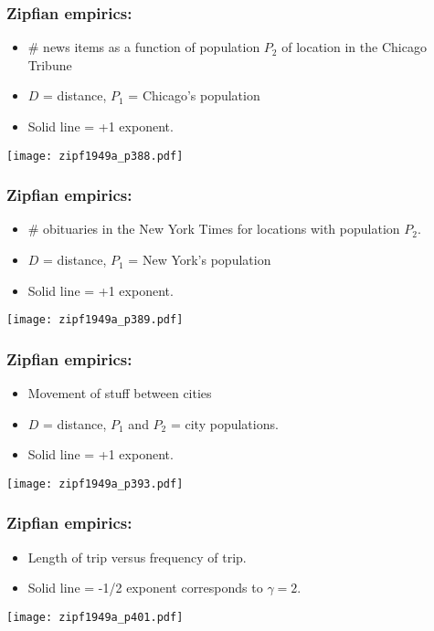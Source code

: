 \begin{frame}
  \frametitle{Zipfian empirics:}

  \begin{itemize}
  \item 
    \# news items as a function of population $P_2$ of location
    in the Chicago Tribune 
  \item
    $D$ = distance, $P_1$ = Chicago's population
  \item
    Solid line = +1 exponent.
  \end{itemize}
  \begin{center}
    \texttt{[image: zipf1949a\_p388.pdf]}
  \end{center}

\end{frame}

\begin{frame}
  \frametitle{Zipfian empirics:}

  \begin{itemize}
  \item 
    \# obituaries in the New York Times for locations
    with population $P_2$.
  \item
    $D$ = distance, $P_1$ = New York's population
  \item
    Solid line = +1 exponent.
  \end{itemize}
  \begin{center}
    \texttt{[image: zipf1949a\_p389.pdf]}
  \end{center}

\end{frame}


\begin{frame}
  \frametitle{Zipfian empirics:}

  \begin{itemize}
  \item 
    Movement of stuff between cities
  \item
    $D$ = distance, $P_1$ and $P_2$ = city populations.
  \item
    Solid line = +1 exponent.
  \end{itemize}

  \centering
  \texttt{[image: zipf1949a\_p393.pdf]}

\end{frame}

\begin{frame}
  \frametitle{Zipfian empirics:}

  \begin{itemize}
  \item 
    Length of trip versus frequency of trip.
  \item
    Solid line = -1/2 exponent corresponds to $\gamma = 2$.
  \end{itemize}
  \texttt{[image: zipf1949a\_p401.pdf]}

\end{frame}

